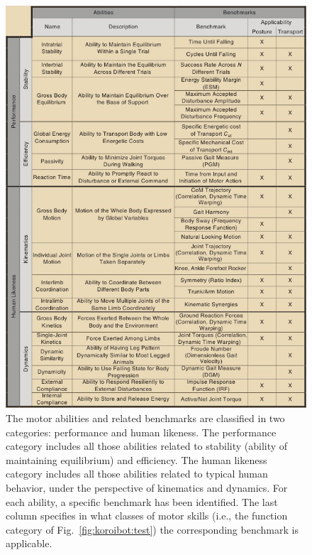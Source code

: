 \begin{figure}
\centering
\includegraphics[width=0.90\linewidth]{figures/koroibot/KPIabilities.jpg}
\caption{The motor abilities and related benchmarks are classified in two categories: performance and human likeness. The
performance category includes all those abilities related to stability (ability of maintaining equilibrium) and efficiency. The human
likeness category includes all those abilities related to typical human behavior, under the perspective of kinematics and dynamics.
For each ability, a specific benchmark has been identified. The last column specifies in what classes of motor skills (i.e., the function
category of Fig.~\ref{fig:koroibot:test}) the corresponding benchmark is applicable.
}
\label{fig:koroibot:performance}
\end{figure}

